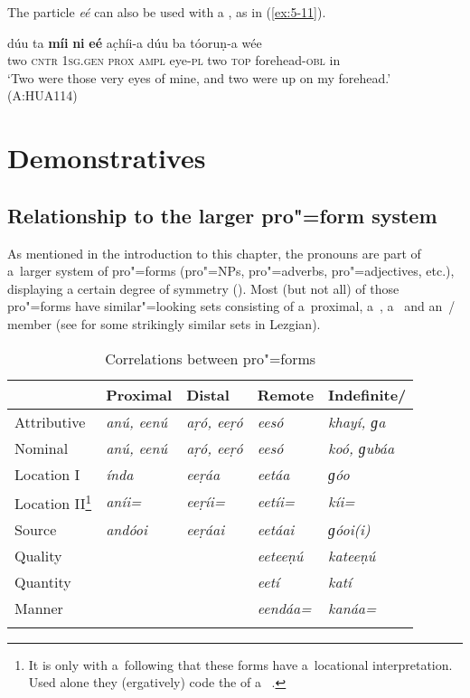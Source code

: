 The particle \textit{eé} can also be used with  a , as in (\ref{ex:5-11}). 


\begin{exe}
\ex
\label{ex:5-11}
\gll dúu ta \textbf{míi} \textbf{ni} \textbf{eé} ac̣híi-a dúu ba tóoruṇ-a wée \\
	two \textsc{cntr} \textsc{1sg.gen} \textsc{prox} \textsc{ampl} eye-\textsc{pl} two \textsc{top} forehead-\textsc{obl} in \\
\glt `Two were those very eyes of mine, and two were up on my forehead.' (A:HUA114) 
\end{exe}

\section{Demonstratives}
\label{sec:5-3}

\subsection{Relationship to the larger pro"=form system}
\label{subsec:5-2-1}


As mentioned in the introduction to this chapter, the  pronouns are part of a~larger system of pro"=forms (pro"=NPs, pro"=adverbs, pro"=adjectives, etc.), displaying a certain degree of symmetry (). Most (but not all) of those pro"=forms have similar"=looking sets consisting of a~proximal, a~, a~ and an~/ member (see \citealt[187--188]{haspelmath1993} for some strikingly similar sets in Lezgian).



\begin{table}[ht]
\caption{Correlations between pro"=forms}
\begin{tabularx}{\textwidth}{ Q Q Q Q Q }
\lsptoprule
&
Proximal
&
Distal
&
Remote
&
Indefinite/{\allowbreak}\\\midrule
Attributive &
\textit{anú, eenú} &
\textit{aṛó, eeṛó} &
\textit{eesó} &
\textit{khayí, ɡa} \\
Nominal &
\textit{anú, eenú} &
\textit{aṛó, eeṛó} &
\textit{eesó} &
\textit{koó, ɡubáa} \\
Location I &
\textit{índa} &
\textit{eeṛáa} &
\textit{eetáa} &
\textit{ɡóo} \\
Location II\footnote{It is only with a~following  that these forms have a~locational interpretation. Used alone they (ergatively) code the  of a~  .} &
\textit{aníi=} &
\textit{eeṛíi=} &
\textit{eetíi=} &
\textit{kíi=} \\
Source &
\textit{andóoi} &
\textit{eeṛáai} &
\textit{eetáai} &
\textit{ɡóoi(i)} \\
Quality &
&
&
\textit{eeteeṇú} &
\textit{kateeṇú} \\
Quantity &
&
&
\textit{eetí} &
\textit{katí} \\
Manner &
&
&
\textit{eendáa=} &
\textit{kanáa=} \\\lspbottomrule
\end{tabularx}
\label{tab:5-2}
\end{table}


